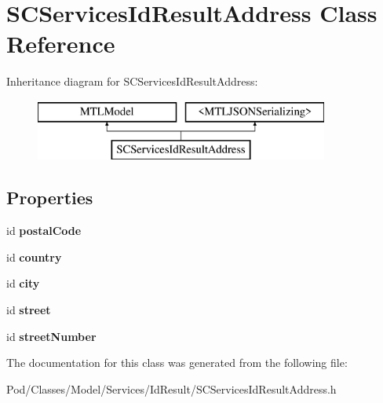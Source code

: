 \hypertarget{interface_s_c_services_id_result_address}{}\section{S\+C\+Services\+Id\+Result\+Address Class Reference}
\label{interface_s_c_services_id_result_address}
Inheritance diagram for S\+C\+Services\+Id\+Result\+Address\+:\begin{figure}[H]
\begin{center}
\leavevmode
\includegraphics[height=2.000000cm]{interface_s_c_services_id_result_address}
\end{center}
\end{figure}
\subsection*{Properties}
\begin{DoxyCompactItemize}
\item 
id {\bfseries postal\+Code}\hypertarget{interface_s_c_services_id_result_address_afaa1f9c4d1576df5e192b24a7313e039}{}\label{interface_s_c_services_id_result_address_afaa1f9c4d1576df5e192b24a7313e039}

\item 
id {\bfseries country}\hypertarget{interface_s_c_services_id_result_address_a2db3352b5527264390482252422c7515}{}\label{interface_s_c_services_id_result_address_a2db3352b5527264390482252422c7515}

\item 
id {\bfseries city}\hypertarget{interface_s_c_services_id_result_address_a2eff3bdd3abc1f6095d7474d3f988b33}{}\label{interface_s_c_services_id_result_address_a2eff3bdd3abc1f6095d7474d3f988b33}

\item 
id {\bfseries street}\hypertarget{interface_s_c_services_id_result_address_a8ca5b21da030fb4ebe488ec577cfe3ac}{}\label{interface_s_c_services_id_result_address_a8ca5b21da030fb4ebe488ec577cfe3ac}

\item 
id {\bfseries street\+Number}\hypertarget{interface_s_c_services_id_result_address_ad4d8d63a43f1bb7a9abf5a29ebbde753}{}\label{interface_s_c_services_id_result_address_ad4d8d63a43f1bb7a9abf5a29ebbde753}

\end{DoxyCompactItemize}


The documentation for this class was generated from the following file\+:\begin{DoxyCompactItemize}
\item 
Pod/\+Classes/\+Model/\+Services/\+Id\+Result/S\+C\+Services\+Id\+Result\+Address.\+h\end{DoxyCompactItemize}

